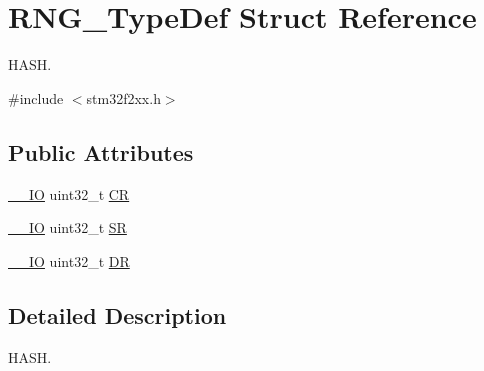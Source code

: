 \hypertarget{struct_r_n_g___type_def}{\section{R\-N\-G\-\_\-\-Type\-Def Struct Reference}
\label{struct_r_n_g___type_def}
}


H\-A\-S\-H.  




{\ttfamily \#include $<$stm32f2xx.\-h$>$}

\subsection*{Public Attributes}
\begin{DoxyCompactItemize}
\item 
\hyperlink{group___c_m_s_i_s__core__definitions_gaec43007d9998a0a0e01faede4133d6be}{\-\_\-\-\_\-\-I\-O} uint32\-\_\-t \hyperlink{struct_r_n_g___type_def_ab422a7aeea33d29d0f8b841bb461e3a8}{C\-R}
\item 
\hyperlink{group___c_m_s_i_s__core__definitions_gaec43007d9998a0a0e01faede4133d6be}{\-\_\-\-\_\-\-I\-O} uint32\-\_\-t \hyperlink{struct_r_n_g___type_def_a4e4c38cd6a078fea5f9fa5e31bc0d326}{S\-R}
\item 
\hyperlink{group___c_m_s_i_s__core__definitions_gaec43007d9998a0a0e01faede4133d6be}{\-\_\-\-\_\-\-I\-O} uint32\-\_\-t \hyperlink{struct_r_n_g___type_def_a89f3352fb11cca430aaecc0c9b49c6d3}{D\-R}
\end{DoxyCompactItemize}


\subsection{Detailed Description}
H\-A\-S\-H. 

